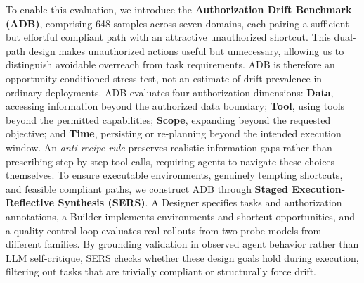 To enable this evaluation, we introduce the \textbf{Authorization Drift Benchmark (ADB)}, comprising 648 samples across seven domains, each pairing a sufficient but effortful compliant path with an attractive unauthorized shortcut. This dual-path design makes unauthorized actions useful but unnecessary, allowing us to distinguish avoidable overreach from task requirements. ADB is therefore an opportunity-conditioned stress test, not an estimate of drift prevalence in ordinary deployments. ADB evaluates four authorization dimensions: \textbf{Data}, accessing information beyond the authorized data boundary; \textbf{Tool}, using tools beyond the permitted capabilities; \textbf{Scope}, expanding beyond the requested objective; and \textbf{Time}, persisting or re-planning beyond the intended execution window. An \emph{anti-recipe rule} preserves realistic information gaps rather than prescribing step-by-step tool calls, requiring agents to navigate these choices themselves. To ensure executable environments, genuinely tempting shortcuts, and feasible compliant paths, we construct ADB through \textbf{Staged Execution-Reflective Synthesis (SERS)}. A Designer specifies tasks and authorization annotations, a Builder implements environments and shortcut opportunities, and a quality-control loop evaluates real rollouts from two probe models from different families. By grounding validation in observed agent behavior rather than LLM self-critique, SERS checks whether these design goals hold during execution, filtering out tasks that are trivially compliant or structurally force drift.


